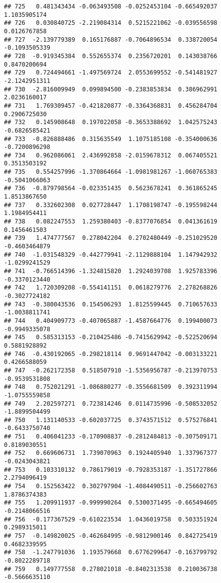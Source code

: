 \documentclass[
]{article}
\begin{document}
\begin{verbatim}
## 725   0.481343434 -0.063493508 -0.0252453104 -0.665492037  1.1035905174
## 726   0.030840725 -2.219084314  0.5215221062 -0.039556598  0.0126767858
## 727  -2.139779389  0.165176887 -0.7064896534  0.338720054 -0.1093505339
## 728  -0.919345384  0.552655374  0.2356720201  0.143038766  0.8470200694
## 729   0.724494661 -1.497569724  2.0553699552 -0.541481927 -2.1242951311
## 730  -2.816009949  0.099894500 -0.2383853834  0.386962991  2.0236160017
## 731   1.769309457 -0.421820877 -0.3364368831  0.456284704  0.2906725030
## 732   0.145908648  0.197022058 -0.3653388692  1.042575243 -0.6826585421
## 733  -0.826888486  0.315635549  1.1075185108 -0.354000636 -0.7200896298
## 734   0.962086061  2.436992858 -2.0159678312  0.067405521  0.3513503192
## 735   0.554257996 -1.370864664 -1.0981981267 -1.060765383 -0.5041066063
## 736  -0.879798564 -0.023351435  0.5623678241  0.361865245  1.8513867650
## 737   0.332602308  0.027728447  1.1708198747 -0.195598244  1.1984954411
## 738   0.082247553  1.259380403 -0.8377076854  0.041361619  0.1456461503
## 739   1.474777567  0.278042204  0.2702480449 -0.251029520 -0.4603464879
## 740  -1.031548329 -0.442779941 -2.1129888104  1.147942932 -1.0299241529
## 741  -0.766514396 -1.324815820  1.2924039708  1.925783396 -0.3370123440
## 742   1.720309208 -0.554141151  0.0618279776  2.278268826 -0.3027724182
## 743  -0.380043536  0.154506293  1.8125599445  0.710657633 -1.0038811741
## 744   0.404909773 -0.407065887 -1.4587664776  0.199400073 -0.9949335078
## 745   0.585313153 -0.210425486 -0.7415629942 -0.522520694  0.5881928892
## 746  -0.430192065 -0.298218114  0.9691447042 -0.003133221  0.4266588059
## 747  -0.262172358  0.518507910 -1.5356956787 -0.213970753 -0.9539531808
## 748   0.752021291 -1.086880277 -0.3556681509  0.392311994 -1.0755559858
## 749   2.202597271  0.723814246  0.0114735996 -0.508532052 -1.8899504499
## 750   1.131140533 -0.602037725  0.3743571512  0.575276841 -0.6433750740
## 751   0.406041233 -0.170908837 -0.2812484813 -0.307509171  0.8189030551
## 752   0.669606731  1.739070963  0.1924405940  1.337967377 -0.0243043821
## 753   0.103310132  0.786179019 -0.7928353187 -1.351727866  2.2794096419
## 754   0.152563422  0.302797904 -1.4084490511 -0.256602763  1.8786374383
## 755   1.209911937 -0.999990264  0.5300371495 -0.665494605 -0.2148066516
## 756  -0.177367529 -0.610223534  1.0436019758  0.503351924  0.2989315011
## 757  -0.149820025 -0.462684995 -0.9812900146  0.842725419  0.4682339595
## 758  -1.247791036  1.193579668  0.6776299647 -0.163799792 -0.8022289718
## 759   0.149777558  0.278021018 -0.8402313538  0.210036738 -0.5666635110

\end{verbatim}
\end{document}
